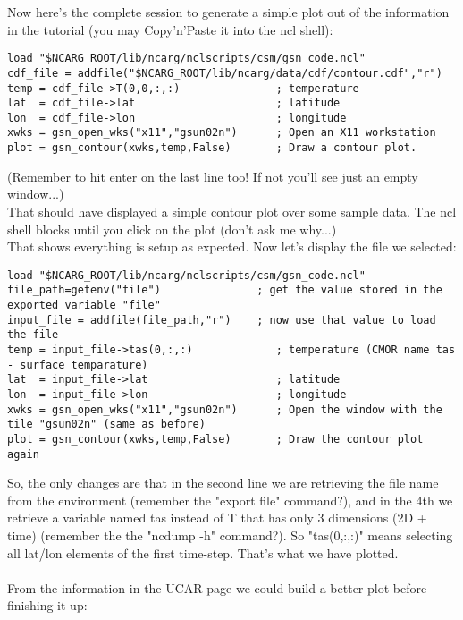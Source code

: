 \documentclass[a4paper,11pt]{ltxdoc}
\begin{document}
Now here's the complete session to generate a simple plot out of the information in the tutorial (you may Copy'n'Paste it into the ncl shell):
\begin{lstlisting}
load "$NCARG_ROOT/lib/ncarg/nclscripts/csm/gsn_code.ncl" 
cdf_file = addfile("$NCARG_ROOT/lib/ncarg/data/cdf/contour.cdf","r")
temp = cdf_file->T(0,0,:,:)               ; temperature
lat  = cdf_file->lat                      ; latitude
lon  = cdf_file->lon                      ; longitude
xwks = gsn_open_wks("x11","gsun02n")      ; Open an X11 workstation
plot = gsn_contour(xwks,temp,False)       ; Draw a contour plot.
\end{lstlisting}
(Remember to hit enter on the last line too! If not you'll see just an empty window...)\\

That should have displayed a simple contour plot over some sample data. The ncl shell blocks until you click on the plot (don't ask me why...)\\
That shows everything is setup as expected. Now let's display the file we selected:
\begin{lstlisting}
load "$NCARG_ROOT/lib/ncarg/nclscripts/csm/gsn_code.ncl" 
file_path=getenv("file")               ; get the value stored in the exported variable "file" 
input_file = addfile(file_path,"r")    ; now use that value to load the file
temp = input_file->tas(0,:,:)             ; temperature (CMOR name tas - surface temparature)
lat  = input_file->lat                    ; latitude
lon  = input_file->lon                    ; longitude
xwks = gsn_open_wks("x11","gsun02n")      ; Open the window with the tile "gsun02n" (same as before)
plot = gsn_contour(xwks,temp,False)       ; Draw the contour plot again
\end{lstlisting}
So, the only changes are that in the second line we are retrieving the file name from the environment (remember the "export file" command?), and in the 4th we retrieve a variable named tas instead of T that has only 3 dimensions (2D + time) (remember the the "ncdump -h" command?). So "tas(0,:,:)" means selecting all lat/lon elements of the first time-step. That's what we have plotted. \\
\\
From the information in the UCAR page we could build a better plot before finishing it up:
\end{document}
